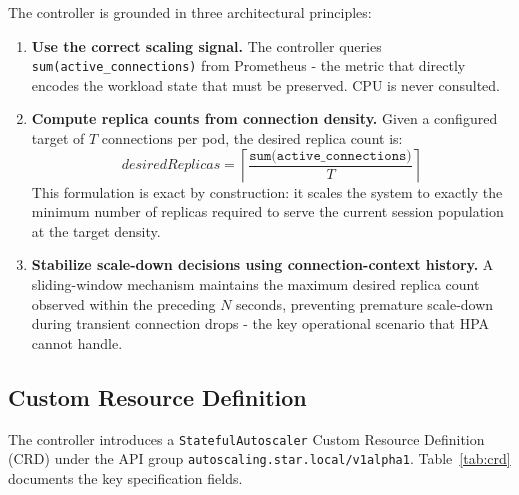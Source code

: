 \documentclass[twocolumn]{svjour3}
\begin{document}
The controller is grounded in three architectural principles:

\begin{enumerate}[leftmargin=*]
\item \textbf{Use the correct scaling signal.} The controller queries \texttt{sum(active\_connections)} from Prometheus - the metric that directly encodes the workload state that must be preserved. CPU is never consulted.

\item \textbf{Compute replica counts from connection density.} Given a configured target of $T$ connections per pod, the desired replica count is:
\begin{equation}
\textit{desiredReplicas} = \left\lceil \frac{\texttt{sum(active\_connections)}}{T} \right\rceil
\label{eq:stateful}
\end{equation}
This formulation is exact by construction: it scales the system to exactly the minimum number of replicas required to serve the current session population at the target density.

\item \textbf{Stabilize scale-down decisions using connection-context history.} A sliding-window mechanism maintains the maximum desired replica count observed within the preceding $N$ seconds, preventing premature scale-down during transient connection drops - the key operational scenario that HPA cannot handle.
\end{enumerate}

\subsection{Custom Resource Definition}

The controller introduces a \texttt{StatefulAutoscaler} Custom Resource Definition (CRD) under the API group \texttt{autoscaling.star.local/v1alpha1}. Table~\ref{tab:crd} documents the key specification fields.
\end{document}
